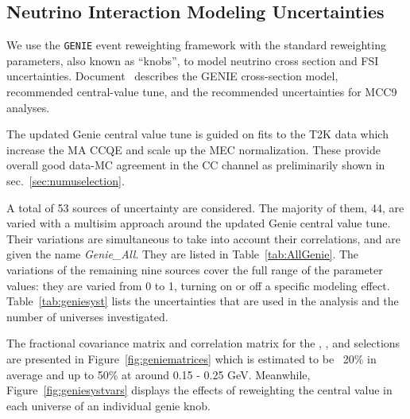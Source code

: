 \subsection{Neutrino Interaction Modeling Uncertainties }
\label{sec:systematics:xsec}

We use the \texttt{GENIE} event reweighting framework with the standard reweighting parameters, also known as ``knobs'', to model neutrino cross section and FSI uncertainties. Document~\cite{bib:geniesupportnote} describes the GENIE cross-section model, recommended central-value tune, and the recommended uncertainties for MCC9 analyses. 

The updated Genie central value tune is guided on fits to the T2K data which increase the MA CCQE and scale up the MEC normalization. These provide overall good data-MC agreement in the \numu CC channel as preliminarily shown in sec.~\ref{sec:numuselection}.

A total of 53 sources of uncertainty are considered. The majority of them, 44, are varied with a multisim approach around the updated Genie central value tune. Their variations are simultaneous to take into account their correlations, and are given the name \textit{Genie\_All}. They are listed in Table~\ref{tab:AllGenie}. The variations of the remaining nine sources cover the full range of the parameter values: they are varied from 0 to 1, turning on or off a specific modeling effect. Table~\ref{tab:geniesyst} lists the uncertainties that are used in the analysis and the number of universes investigated. %

The fractional covariance matrix and correlation matrix for the \npsel, \zpsel, and \numu selections are presented in Figure~\ref{fig:geniematrices} which is estimated to be ~20\% in average and up to 50\% at around 0.15 - 0.25 GeV. Meanwhile, Figure~\ref{fig:geniesystvars} displays the effects of reweighting the central value in each universe of an individual genie knob.

